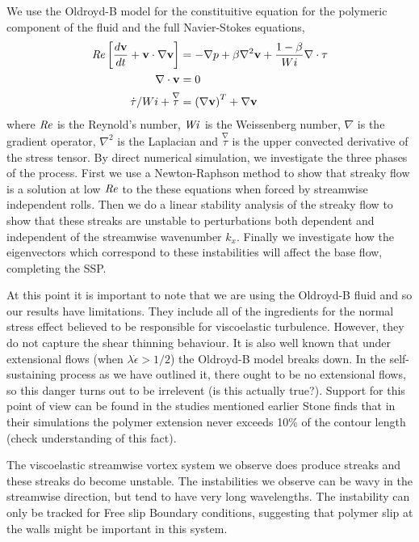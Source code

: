 \documentclass{jfm}
\newcommand\Wi{\mbox{\textit{Wi}}}
\newcommand{\dt}[1]{\frac{d #1}{d t}} %
\newcommand\Rey{\mbox{\textit{Re}}}  %
\begin{document}
We use the Oldroyd-B model for the constituitive equation for the polymeric
component of the fluid and the full Navier-Stokes equations,
\begin{align}
    \Rey \left[ \dt{\mathbf{v}} + \mathbf{v} \cdot \nabla  \mathbf{v} \right] &= - \nabla p + \beta \nabla^{2} \mathbf{v} + \frac{1-\beta}{Wi} \nabla \cdot \mathbf{\tau} \label{eq:Navier-Stokes}\\
    \nabla \cdot \mathbf{v} &= 0 \label{eq:incompressibility}\\
    \dot{\tau}/Wi + \overset{\nabla}\tau &= \left(\nabla \mathbf{v}\right)^{T} + \nabla{\mathbf{v}}\label{eq:Oldroyd-B}
\end{align}
where $\Rey$ is the Reynold's number, $\Wi$ is the Weissenberg number, $\nabla$
is the gradient operator, $\nabla^{2}$ is the Laplacian and $
\overset{\nabla}\tau$ is the upper convected derivative of the stress tensor.
By direct numerical simulation, we investigate the three phases of the process.
First we use a Newton-Raphson method to show that streaky flow is a solution at
low $\Rey$ to the these equations when forced by streamwise independent rolls.
Then we do a linear stability analysis of the streaky flow to show that these
streaks are unstable to perturbations both dependent and independent of the
streamwise wavenumber $k_x$. Finally we investigate how the eigenvectors which
correspond to these instabilities will affect the base flow, completing the
SSP.

At this point it is important to note that we are using the Oldroyd-B fluid and
so our results have limitations. They include all of the ingredients for the
normal stress effect believed to be responsible for viscoelastic turbulence.
However, they do not capture the shear thinning behaviour. It is also well
known that under extensional flows (when $\lambda \dot{\epsilon} > 1/2$) the
Oldroyd-B model breaks down. In the self-sustaining process as we have outlined
it, there ought to be no extensional flows, so this danger turns out to be
irrelevent (is this actually true?). Support for this point of view can be
found in the studies mentioned earlier Stone \cite{Stone2004} finds that in
their simulations the polymer extension never exceeds 10\% of the contour
length (check understanding of this fact).

The viscoelastic streamwise vortex system we observe does produce streaks and
these streaks do become unstable. The instabilities we observe can be wavy in
the streamwise direction, but tend to have very long wavelengths. The
instability can only be tracked for Free slip Boundary conditions, suggesting
that polymer slip at the walls might be important in this system. 
\end{document}
